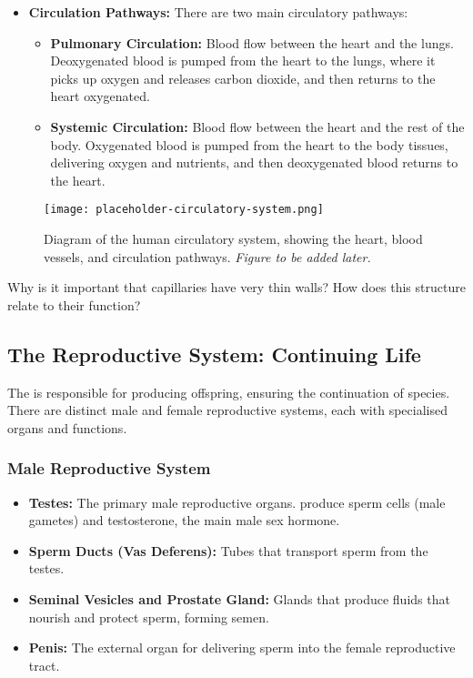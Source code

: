 \begin{itemize}
    \item \textbf{Circulation Pathways:}  There are two main circulatory pathways:
    \begin{itemize}
        \item \textbf{Pulmonary Circulation:}  Blood flow between the heart and the lungs.  Deoxygenated blood is pumped from the heart to the lungs, where it picks up oxygen and releases carbon dioxide, and then returns to the heart oxygenated.
        \item \textbf{Systemic Circulation:}  Blood flow between the heart and the rest of the body.  Oxygenated blood is pumped from the heart to the body tissues, delivering oxygen and nutrients, and then deoxygenated blood returns to the heart.
    \end{itemize}
\end{itemize}

\begin{figure}[htb]
    \centering
    \texttt{[image: placeholder-circulatory-system.png]}
    \caption{Diagram of the human circulatory system, showing the heart, blood vessels, and circulation pathways. \textit{Figure to be added later.}}
    \label{fig:circulatory-system}
\end{figure}

\begin{stopandthink}
Why is it important that capillaries have very thin walls? How does this structure relate to their function?
\end{stopandthink}


\subsection{The Reproductive System: Continuing Life}

The  is responsible for producing offspring, ensuring the continuation of species.  There are distinct male and female reproductive systems, each with specialised organs and functions.

\subsubsection{Male Reproductive System}

\begin{itemize}
    \item \textbf{Testes:}  The primary male reproductive organs.  produce sperm cells (male gametes) and testosterone, the main male sex hormone.
    \item \textbf{Sperm Ducts (Vas Deferens):}  Tubes that transport sperm from the testes.
    \item \textbf{Seminal Vesicles and Prostate Gland:}  Glands that produce fluids that nourish and protect sperm, forming semen.
    \item \textbf{Penis:}  The external organ for delivering sperm into the female reproductive tract.
\end{itemize}

